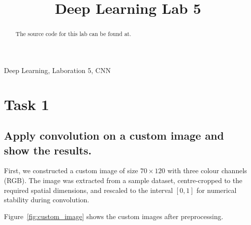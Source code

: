 \documentclass[conference]{IEEEtran}
\begin{document}
\title{Deep Learning Lab 5 \\
}

\author{
\and
{}
\and
{}
}

\maketitle

\thispagestyle{plain}
\pagestyle{plain}


\begin{IEEEkeywords}
Deep Learning, Laboration 5, CNN 
\end{IEEEkeywords}
\begin{abstract}
    The source code for this lab can be found at\cite{dataset}. 
\end{abstract}

\section{Task 1}
\subsection{Apply convolution on a custom image and show the results.}
First, we constructed a custom image of size $70 \times 120$ with three colour channels (RGB). 
The image was extracted from a sample dataset, centre-cropped to the required spatial dimensions, 
and rescaled to the interval $[0,1]$ for numerical stability during convolution.

Figure~\ref{fig:custom_image} shows the custom images after preprocessing.
\end{document}

